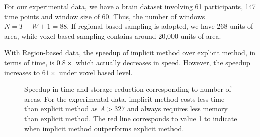 \documentclass{article}[12pt]
\begin{document}
For our experimental data, we have a brain dataset involving 61 participants, 147 time points and window size of 60. Thus, the number of windows $N = T-W+1 = 88$.  If regional based sampling is adopted, we have 268 units of area, while voxel based sampling contains around 20,000 units of area. 

With Region-based data, the speedup of implicit method over explicit method, in terms of time, is $0.8\times$ which actually decreases in speed. However, the speedup increases to $61\times$ under voxel based level.


\bigbreak

\begin{figure} \centering
{}
\hskip 1pt


\caption{Speedup in time and storage reduction corresponding to number of areas. For the experimental data, implicit method costs less time than explicit method as $A > 327$ and always requires less memory than explicit method.  The red line corresponds to value 1 to indicate when implicit method outperforms explicit method. }
\end{figure}
\end{document}
